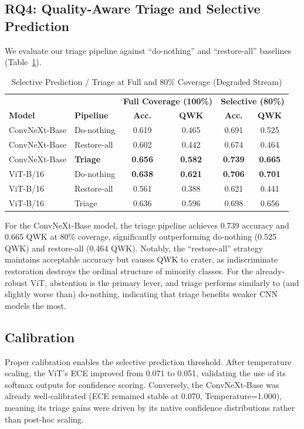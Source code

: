 \documentclass[runningheads]{llncs}
\begin{document}
\subsection{RQ4: Quality-Aware Triage and Selective Prediction}
We evaluate our triage pipeline against ``do-nothing'' and ``restore-all'' baselines (Table~\ref{tab:triage}).

\begin{table}[!t]
\caption{Selective Prediction / Triage at Full and 80\% Coverage (Degraded Stream)}
\label{tab:triage}
\begin{center}
\begin{tabular}{llcc|cc}
\toprule
 & & \multicolumn{2}{c|}{\textbf{Full Coverage (100\%)}} & \multicolumn{2}{c}{\textbf{Selective (80\%)}} \\
\textbf{Model} & \textbf{Pipeline} & \textbf{Acc.} & \textbf{QWK} & \textbf{Acc.} & \textbf{QWK} \\
\midrule
ConvNeXt-Base & Do-nothing  & 0.619 & 0.465 & 0.691 & 0.525 \\
ConvNeXt-Base & Restore-all & 0.602 & 0.442 & 0.674 & 0.464 \\
ConvNeXt-Base & \textbf{Triage}    & \textbf{0.656} & \textbf{0.582} & \textbf{0.739} & \textbf{0.665} \\
\midrule
ViT-B/16 & Do-nothing  & \textbf{0.638} & \textbf{0.621} & \textbf{0.706} & \textbf{0.701} \\
ViT-B/16 & Restore-all & 0.561 & 0.388 & 0.621 & 0.441 \\
ViT-B/16 & Triage      & 0.636 & 0.596 & 0.698 & 0.656 \\
\bottomrule
\end{tabular}
\end{center}
\end{table}

For the ConvNeXt-Base model, the triage pipeline achieves 0.739 accuracy and 0.665 QWK at 80\% coverage, significantly outperforming do-nothing (0.525 QWK) and restore-all (0.464 QWK). Notably, the ``restore-all'' strategy maintains acceptable accuracy but causes QWK to crater, as indiscriminate restoration destroys the ordinal structure of minority classes. For the already-robust ViT, abstention is the primary lever, and triage performs similarly to (and slightly worse than) do-nothing, indicating that triage benefits weaker CNN models the most.

\subsection{Calibration}
Proper calibration enables the selective prediction threshold. After temperature scaling, the ViT's ECE improved from 0.071 to 0.051, validating the use of its softmax outputs for confidence scoring. Conversely, the ConvNeXt-Base was already well-calibrated (ECE remained stable at 0.070, Temperature=1.000), meaning its triage gains were driven by its native confidence distributions rather than post-hoc scaling.
\end{document}
